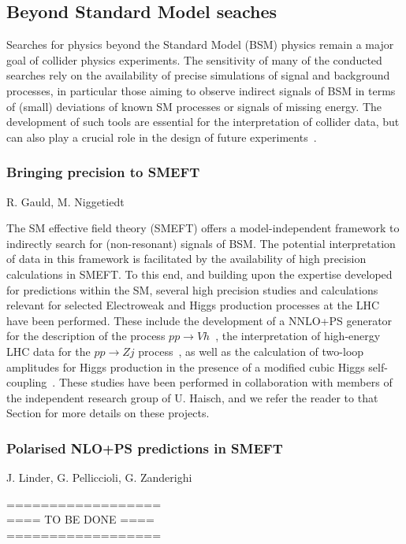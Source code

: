\documentclass{FBR_Bericht_2025}
\begin{document}
\subsection{Beyond Standard Model seaches}
\begin{refsection}
Searches for physics beyond the Standard Model (BSM) physics remain a major goal of collider physics experiments.
The sensitivity of many of the conducted searches rely on the availability of precise simulations of signal and background processes, in particular those aiming to observe indirect signals of BSM in terms of (small) deviations of known SM processes or signals of missing energy. 
The development of such tools are essential for the interpretation of collider data, but can also play a crucial role in the design of future experiments~\cite{Bechtle:2024atq}.
%
\subsubsection{Bringing precision to SMEFT}
\begin{Namen}
R. Gauld, M. Niggetiedt%
\end{Namen}
The SM effective field theory (SMEFT) offers a model-independent framework to indirectly search for (non-resonant) signals of BSM.
The potential interpretation of data in this framework is facilitated by the availability of high precision calculations in SMEFT.
To this end, and building upon the expertise developed for predictions within the SM, several high precision studies and calculations relevant for selected Electroweak and Higgs production processes at the LHC have been performed.
These include the development of a NNLO+PS generator for the description of the process $pp\to Vh$~\cite{Gauld:2023gtb}, the interpretation of high-energy LHC data for the $pp\to Zj$ process~\cite{Gauld:2024glt}, as well as the calculation of two-loop amplitudes for Higgs production in the presence of a modified cubic Higgs self-coupling~\cite{Haisch:2024nzv}.
These studies have been performed in collaboration with members of the independent research group of U. Haisch, and we refer the reader to that Section for more details on these projects.
%
\subsubsection{Polarised NLO+PS predictions in SMEFT}
\begin{Namen}
J. Linder, G. Pelliccioli, G. Zanderighi
\end{Namen}
%
{\color{red} ==================\\ ====\; TO BE DONE\; ====\\ ==================}
%

\end{refsection}
\end{document}
